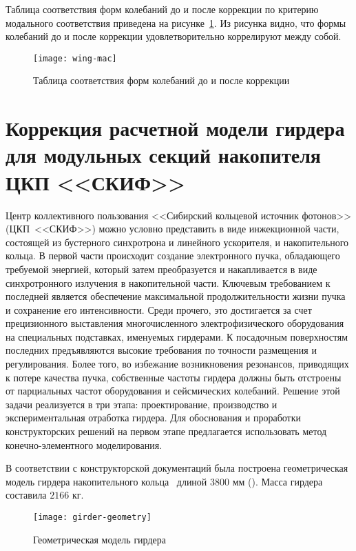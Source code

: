 Таблица соответствия форм колебаний до и после коррекции по критерию модального соответствия приведена на рисунке~\ref{fig:wing-mac}. Из рисунка видно, что формы колебаний до и после коррекции удовлетворительно коррелируют между собой.

\begin{figure}[H]
	\centerfloat
	\texttt{[image: wing-mac]}
	\caption{Таблица соответствия форм колебаний до и после коррекции} \label{fig:wing-mac}
\end{figure}

\section{Коррекция расчетной модели гирдера для модульных секций накопителя ЦКП <<СКИФ>>}

Центр коллективного пользования <<Сибирский кольцевой источник фотонов>> (ЦКП~<<СКИФ>>) можно условно представить в виде инжекционной части, состоящей из бустерного синхротрона и линейного ускорителя, и накопительного кольца. В первой части происходит создание электронного пучка, обладающего требуемой энергией, который затем преобразуется и накапливается в виде синхротронного излучения в накопительной части. Ключевым требованием к последней является обеспечение максимальной продолжительности жизни пучка и сохранение его интенсивности. Среди прочего, это достигается за счет прецизионного выставления многочисленного электрофизического оборудования на специальных подставках, именуемых гирдерами. К посадочным поверхностям последних предъявляются высокие требования по точности размещения и регулирования. Более того, во избежание возникновения резонансов, приводящих к потере качества пучка, собственные частоты гирдера должны быть отстроены от парциальных частот оборудования и сейсмических колебаний. Решение этой задачи реализуется в три этапа: проектирование, производство и экспериментальная отработка гирдера. Для обоснования и проработки конструкторских решений на первом этапе предлагается использовать метод конечно-элементного моделирования.

В соответствии с конструкторской документаций была построена геометрическая модель гирдера накопительного кольца~ длиной $ 3800 $ мм (). Масса гирдера составила $ 2166 $ кг. 

\begin{figure}[H]
	\centering
	\texttt{[image: girder-geometry]}
	\caption{Геометрическая модель гирдера} \label{fig:girder-geometry}
\end{figure}

